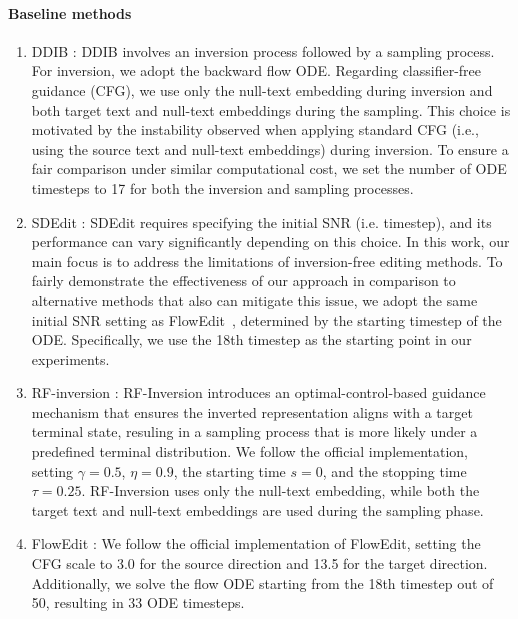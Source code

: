 \paragraph{Baseline methods}
\label{sec:baseline}
\begin{enumerate}
    \item DDIB \cite{su2022dual} : 
    DDIB involves an inversion process followed by a sampling process. For inversion, we adopt the backward flow ODE. Regarding classifier-free guidance (CFG), we use only the null-text embedding during inversion and both target text and null-text embeddings during the sampling. This choice is motivated by the instability observed when applying standard CFG (i.e., using the source text and null-text embeddings) during inversion. 
    To ensure a fair comparison under similar computational cost, we set the number of ODE timesteps to 17 for both the inversion and sampling processes.
    
    \item SDEdit \cite{meng2021sdedit} : 
    SDEdit requires specifying the initial SNR (i.e. timestep), and its performance can vary significantly depending on this choice. In this work, our main focus is to address the limitations of inversion-free editing methods. To fairly demonstrate the effectiveness of our approach in comparison to alternative methods that also can mitigate this issue, we adopt the same initial SNR setting as FlowEdit~\cite{kulikov2024flowedit}, determined by the starting timestep of the ODE. Specifically, we use the 18th timestep as the starting point in our experiments.

    \item RF-inversion \cite{rout2025semantic} :
    RF-Inversion introduces an optimal-control-based guidance mechanism that ensures the inverted representation aligns with a target terminal state, resuling in a sampling process that is more likely under a predefined terminal distribution. We follow the official implementation, setting $\gamma=0.5$, $\eta=0.9$, the starting time $s=0$, and the stopping time $\tau = 0.25$. RF-Inversion uses only the null-text embedding, while both the target text and null-text embeddings are used during the sampling phase.
    
    \item FlowEdit \cite{kulikov2024flowedit} :
    We follow the official implementation of FlowEdit, setting the CFG scale to 3.0 for the source direction and 13.5 for the target direction. Additionally, we solve the flow ODE starting from the 18th timestep out of 50, resulting in 33 ODE timesteps.
    
\end{enumerate}

